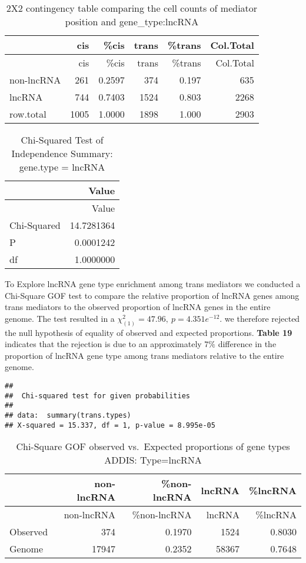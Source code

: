 \documentclass[
  12pt,
]{article}
\begin{document}
\begin{longtable}[]{@{}lrrrrr@{}}
\caption{2X2 contingency table comparing the cell counts of mediator
position and gene\_type:lncRNA}\tabularnewline
\toprule
& cis & \%cis & trans & \%trans & Col.Total\tabularnewline
\midrule
\endfirsthead
\toprule
& cis & \%cis & trans & \%trans & Col.Total\tabularnewline
\midrule
\endhead
non-lncRNA & 261 & 0.2597 & 374 & 0.197 & 635\tabularnewline
lncRNA & 744 & 0.7403 & 1524 & 0.803 & 2268\tabularnewline
row.total & 1005 & 1.0000 & 1898 & 1.000 & 2903\tabularnewline
\bottomrule
\end{longtable}

\begin{longtable}[]{@{}lr@{}}
\caption{Chi-Squared Test of Independence Summary: gene.type =
lncRNA}\tabularnewline
\toprule
& Value\tabularnewline
\midrule
\endfirsthead
\toprule
& Value\tabularnewline
\midrule
\endhead
Chi-Squared & 14.7281364\tabularnewline
P & 0.0001242\tabularnewline
df & 1.0000000\tabularnewline
\bottomrule
\end{longtable}

To Explore lncRNA gene type enrichment among trans mediators we
conducted a Chi-Square GOF test to compare the relative proportion of
lncRNA genes among trans mediators to the observed proportion of lncRNA
genes in the entire genome. The test resulted in a
\(\chi^2_{(1)} = 47.96, \ p=4.351e^{-12}\). we therefore rejected the
null hypothesis of equality of observed and expected proportions.
\textbf{Table 19} indicates that the rejection is due to an
approximately \(7\%\) difference in the proportion of lncRNA gene type
among trans mediators relative to the entire genome.

\begin{verbatim}
## 
##  Chi-squared test for given probabilities
## 
## data:  summary(trans.types)
## X-squared = 15.337, df = 1, p-value = 8.995e-05
\end{verbatim}

\begin{longtable}[]{@{}lrrrr@{}}
\caption{Chi-Square GOF observed vs.~Expected proportions of gene types
ADDIS: Type=lncRNA}\tabularnewline
\toprule
& non-lncRNA & \%non-lncRNA & lncRNA & \%lncRNA\tabularnewline
\midrule
\endfirsthead
\toprule
& non-lncRNA & \%non-lncRNA & lncRNA & \%lncRNA\tabularnewline
\midrule
\endhead
Observed & 374 & 0.1970 & 1524 & 0.8030\tabularnewline
Genome & 17947 & 0.2352 & 58367 & 0.7648\tabularnewline
\bottomrule
\end{longtable}
\end{document}
